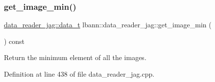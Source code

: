 \subsubsection{\texorpdfstring{get\+\_\+image\+\_\+min()}{get\_image\_min()}}
{\footnotesize\ttfamily \hyperlink{classlbann_1_1data__reader__jag_a7377d6c02c455f019a378489b9b8eab4}{data\+\_\+reader\+\_\+jag\+::data\+\_\+t} lbann\+::data\+\_\+reader\+\_\+jag\+::get\+\_\+image\+\_\+min (\begin{DoxyParamCaption}{ }\end{DoxyParamCaption}) const\hspace{0.3cm}{\ttfamily [protected]}}



Return the minimum element of all the images. 



Definition at line 438 of file data\+\_\+reader\+\_\+jag.\+cpp.



